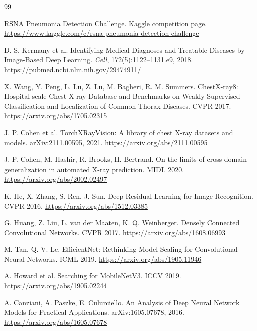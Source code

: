 \documentclass[11pt,a4paper]{article}
\begin{document}
\begin{thebibliography}{99}

RSNA Pneumonia Detection Challenge.
\newblock Kaggle competition page.
\newblock \url{https://www.kaggle.com/c/rsna-pneumonia-detection-challenge}

D. S. Kermany et al.
\newblock Identifying Medical Diagnoses and Treatable Diseases by Image-Based Deep Learning.
\newblock \textit{Cell}, 172(5):1122--1131.e9, 2018.
\newblock \url{https://pubmed.ncbi.nlm.nih.gov/29474911/}

X. Wang, Y. Peng, L. Lu, Z. Lu, M. Bagheri, R. M. Summers.
\newblock ChestX-ray8: Hospital-scale Chest X-ray Database and Benchmarks on Weakly-Supervised Classification and Localization of Common Thorax Diseases.
\newblock CVPR 2017.
\newblock \url{https://arxiv.org/abs/1705.02315}

J. P. Cohen et al.
\newblock TorchXRayVision: A library of chest X-ray datasets and models.
\newblock arXiv:2111.00595, 2021.
\newblock \url{https://arxiv.org/abs/2111.00595}

J. P. Cohen, M. Hashir, R. Brooks, H. Bertrand.
\newblock On the limits of cross-domain generalization in automated X-ray prediction.
\newblock MIDL 2020.
\newblock \url{https://arxiv.org/abs/2002.02497}

K. He, X. Zhang, S. Ren, J. Sun.
\newblock Deep Residual Learning for Image Recognition.
\newblock CVPR 2016.
\newblock \url{https://arxiv.org/abs/1512.03385}

G. Huang, Z. Liu, L. van der Maaten, K. Q. Weinberger.
\newblock Densely Connected Convolutional Networks.
\newblock CVPR 2017.
\newblock \url{https://arxiv.org/abs/1608.06993}

M. Tan, Q. V. Le.
\newblock EfficientNet: Rethinking Model Scaling for Convolutional Neural Networks.
\newblock ICML 2019.
\newblock \url{https://arxiv.org/abs/1905.11946}

A. Howard et al.
\newblock Searching for MobileNetV3.
\newblock ICCV 2019.
\newblock \url{https://arxiv.org/abs/1905.02244}

A. Canziani, A. Paszke, E. Culurciello.
\newblock An Analysis of Deep Neural Network Models for Practical Applications.
\newblock arXiv:1605.07678, 2016.
\newblock \url{https://arxiv.org/abs/1605.07678}


\end{thebibliography}
\end{document}
